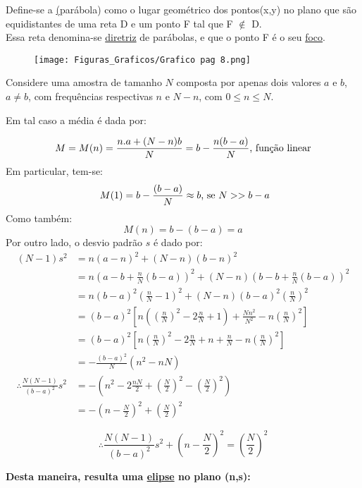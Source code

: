 \documentclass{article}
\begin{document}
Define-se a \underline(parábola) como o lugar geométrico dos pontos(x,y) 
no plano que são equidistantes de uma reta D e um ponto F tal que F 
$\notin$ D.\\
Essa reta denomina-se \underline{diretriz} de parábolas, e que o ponto F é 
o seu \underline{foco}.



\begin{figure}[H]
    \centering
    \texttt{[image: Figuras\_Graficos/Grafico pag 8.png]}
\end{figure}

\pagebreak

Considere uma amostra de tamanho $N$ composta por apenas dois valores $a$ e $b$, $a \neq b$, com frequências respectivas $n$ e $N-n$, com $0 \leq n \leq N$.
 
Em tal caso a média é dada por:
 
\[ M = M(n) = \frac{n . a + (N-n) b}{N} = b - \frac{n(b-a)}{N} \textnormal{, função linear}\]
Em particular, tem-se:
\[\ M(1) = b - \frac{(b-a)}{N} \approx b  \textnormal{, se } N>> b-a\]
Como também: 
\[M(n) = b-(b-a) = a\]
Por outro lado, o desvio padrão $s$ é dado por: 
\begin{align*}
(N-1)s^2 &= n(a-n)^2 + (N-n) (b-n)^2 \\
 &= n (a-b + \frac{n}{N}(b-a))^2 + (N-n)(b-b+\frac{n}{N}(b-a))^2 \\
 &= n (b-a)^2 (\frac{n}{N}-1)^2 + (N-n) (b-a)^2 (\frac{n}{N})^2 \\
 &=(b-a)^2 [n((\frac{n}{N})^2 - 2\frac{n}{N}+1) +\frac{Nn^2}{N^2} -  n(\frac{n}{N})^2] \\
 &=(b-a)^2 [n(\frac{n}{N})^2  - 2\frac{n}{N} +n +\frac{n}{N} -n (\frac{n}{N})^2]\\
 &= - \frac{(b-a)^2}{N} (n^2 - nN) \\ 
\therefore \frac{N(N-1)}{(b-a)^2}s^2 &= {-(n^2 - 2\frac{nN}{2} + (\frac{N}{2})^2-(\frac{N}{2})^2)} \\
 &= - (n - \frac{N}{2})^2 + (\frac{N}{2})^2
\end{align*}

\[
 \therefore \boxed{\frac{N(N-1)}{(b-a)^2}s^2 + (n - \frac{N}{2})^2 = (\frac{N}{2})^2}
\]


\pagebreak

\textbf{Desta maneira, resulta uma \underline{elipse} no plano (n,s):}
\end{document}

